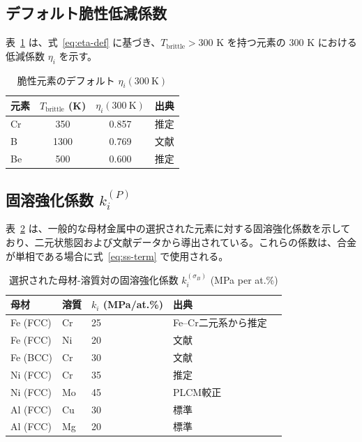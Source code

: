 \documentclass[12pt,a4paper]{article}
\begin{document}
	\subsection{デフォルト脆性低減係数}
	\label{subsec:eta-table}
	表~\ref{tab:eta} は、式~\ref{eq:eta-def} に基づき、$T_{\text{brittle}} > 300$ K を持つ元素の 300 K における低減係数 $\eta_i$ を示す。
	
	\begin{table}[htbp]
		\centering
		\caption{脆性元素のデフォルト $\eta_i(300\ \mathrm{K})$}
		\label{tab:eta}
		\begin{tabular}{lccc}
			\toprule
			\textbf{元素} & $T_{\text{brittle}}$ (K) & $\eta_i(300\ \mathrm{K})$ & \textbf{出典} \\
			\midrule
			Cr & 350 & 0.857 & 推定 \\
			B  & 1300 & 0.769 & 文献 \\
			Be & 500 & 0.600 & 推定 \\
			\bottomrule
		\end{tabular}
	\end{table}
	
	\subsection{固溶強化係数 $k_i^{(P)}$}
	\label{subsec:kss}
	
	表~\ref{tab:kss} は、一般的な母材金属中の選択された元素に対する固溶強化係数を示しており、二元状態図および文献データから導出されている。これらの係数は、合金が単相である場合に式~\ref{eq:ss-term} で使用される。
	
	\begin{longtable}{p{2cm} p{2cm} p{2cm} p{2cm} p{2cm}}
		\caption{選択された母材-溶質対の固溶強化係数 $k_i^{(\sigma_B)}$ (MPa per at.\%)}\label{tab:kss}\\
		\toprule
		\textbf{母材} & \textbf{溶質} & $k_i$ (MPa/at.\%) & \textbf{出典} \\
		\midrule
		Fe (FCC) & Cr & 25 & Fe–Cr二元系から推定 \\
		Fe (FCC) & Ni & 20 & 文献 \\
		Fe (BCC) & Cr & 30 & 文献 \\
		Ni (FCC) & Cr & 35 & 推定 \\
		Ni (FCC) & Mo & 45 & PLCM較正 \\
		Al (FCC) & Cu & 30 & 標準 \\
		Al (FCC) & Mg & 20 & 標準 \\
		\bottomrule
	\end{longtable}
	
\end{document}

